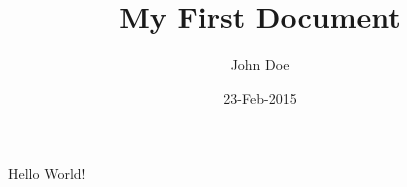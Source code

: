\documentclass{article}
\title {My First Document}
\date {23-Feb-2015}
\author {John Doe}
\begin{document}
	\maketitle
	\newpage

	Hello World!
\end{document}
